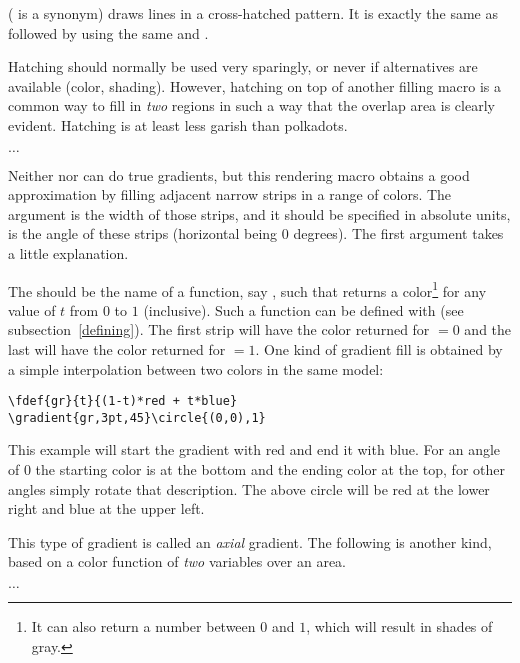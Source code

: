 \documentclass[letterpaper]{article}
\begin{document}
 ( is a synonym) draws lines in a cross-hatched
pattern. It is exactly the same as  followed by 
using the same  and .

Hatching should normally be used very sparingly, or never if
alternatives are available (color, shading). However, hatching on top of
another filling macro is a common way to fill in \emph{two} regions in
such a way that the overlap area is clearly evident. Hatching is at
least less garish than polkadots.

\begin{cd}
$\ldots$%
%
\end{cd}

Neither \MP{} nor \MF{} can do true gradients, but this rendering macro
obtains a good approximation by filling adjacent narrow strips in a
range of colors. The argument  is the width of those strips,
and it should be specified in absolute units,  is the angle
of these strips (horizontal being $0$ degrees). The first argument
takes a little explanation.

The  should be the name of a function, say ,
such that  returns a color\footnote{It can also return a
number between $0$ and $1$, which will result in shades of gray.} for
any value of $t$ from $0$ to $1$ (inclusive). Such a function can be
defined with  (see subsection~\ref{defining}). The first strip
will have the color returned for ${}=0$ and the last will have
the color returned for ${}=1$. One kind of gradient fill is
obtained by a simple interpolation between two colors in the same model:
\begin{verbatim}
\fdef{gr}{t}{(1-t)*red + t*blue}
\gradient{gr,3pt,45}\circle{(0,0),1}
\end{verbatim}
This example will start the gradient with red and end it with blue. For
an angle of $0$ the starting color is at the bottom and the ending color
at the top, for other angles simply rotate that description. The above
circle will be red at the lower right and blue at the upper left.

This type of gradient is called an \emph{axial} gradient. The following
is another kind, based on a color function of \emph{two} variables over
an area.

\begin{cd}
$\ldots$%
%
\end{cd}
\end{document}
